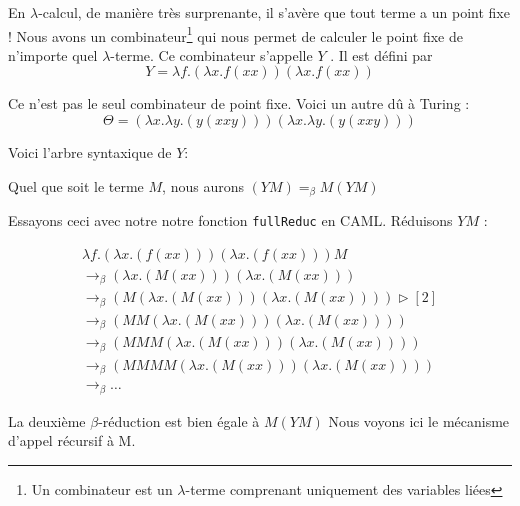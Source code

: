 En $\lambda $-calcul, de manière très surprenante, il s'avère que tout terme a un point fixe !
Nous avons un combinateur\footnote{Un combinateur est un $\lambda$-terme comprenant uniquement 
des variables li\'{e}es} qui nous permet de calculer le point fixe de n'importe quel $\lambda $-terme.
Ce combinateur s'appelle $Y$ . Il est défini par $$ Y=  \lambda f.(\lambda x.f(x x))(\lambda x.f(x x)) $$

Ce n'est pas le seul combinateur de point fixe. Voici un autre d\^{u} \`{a} Turing :
 $$\Theta = (\lambda x. \lambda y. (y (x x y))) (\lambda x. \lambda y. (y (x x y)))$$

Voici l'arbre syntaxique de $Y$:
\begin{center}
\end{center}
Quel que soit le terme $M$, nous aurons  $(YM) = _\beta M(YM)$



Essayons ceci avec notre notre fonction \verb+fullReduc+  en CAML.
Réduisons $YM$ :

$$
\begin{array}{l}
\lambda f . (\lambda x . (f (x x))) (\lambda x . (f (x x))) M \\
\rightarrow _\beta (\lambda x . (M (xx)))(\lambda x . (M(xx))) \\
\rightarrow _\beta  (M(\lambda x . (M(xx)))(\lambda x . (M(xx))))  \triangleright [2] \\
\rightarrow _\beta  (MM(\lambda x . (M(xx)))(\lambda x . (M(xx)))) \\
\rightarrow _\beta  (MMM(\lambda x . (M(xx)))(\lambda x . (M(xx)))) \\
\rightarrow _\beta  (MMMM(\lambda x . (M(xx)))(\lambda x . (M(xx)))) \\
\rightarrow _\beta  \ldots
\end{array}
$$


La deuxième $\beta$-r\'{e}duction est bien \'{e}gale \`{a} $M (Y M)$
Nous voyons ici le mécanisme d'appel récursif à M. 

